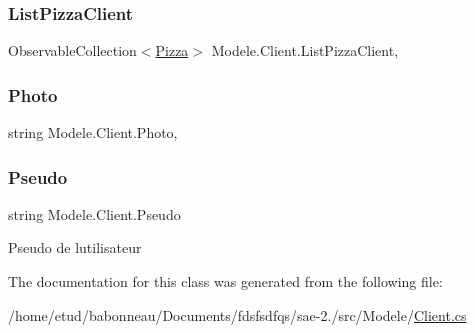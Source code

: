 \subsubsection{\texorpdfstring{List\+Pizza\+Client}{ListPizzaClient}}
{\footnotesize\ttfamily Observable\+Collection$<$\hyperlink{classModele_1_1Pizza}{Pizza}$>$ Modele.\+Client.\+List\+Pizza\+Client\hspace{0.3cm}{\ttfamily [get]}, {\ttfamily [set]}}

\mbox{\label{classModele_1_1Client_a631e7a15fd8974dd434d5801ee95cafa}} 
\subsubsection{\texorpdfstring{Photo}{Photo}}
{\footnotesize\ttfamily string Modele.\+Client.\+Photo\hspace{0.3cm}{\ttfamily [get]}, {\ttfamily [set]}}

\mbox{\label{classModele_1_1Client_a56ea6461c998b196068f435e003d48d3}} 
\subsubsection{\texorpdfstring{Pseudo}{Pseudo}}
{\footnotesize\ttfamily string Modele.\+Client.\+Pseudo\hspace{0.3cm}{\ttfamily [get]}}



Pseudo de l\textquotesingle{}utilisateur 



The documentation for this class was generated from the following file\+:\begin{DoxyCompactItemize}
\item 
/home/etud/babonneau/\+Documents/fdsfsdfqs/sae-\/2./src/\+Modele/\hyperlink{Client_8cs}{Client.\+cs}\end{DoxyCompactItemize}
